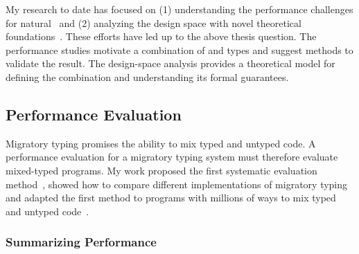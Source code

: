 %
%
%

My research to date has focused on
 (1) understanding the performance challenges for natural~\cite{tfgnvf-popl-2016,gtnffvf-jfp-2019}
 and (2) analyzing the design space with novel theoretical foundations~\cite{gf-icfp-2018}.
These efforts have led up to the above thesis question.
The performance studies motivate a combination of \tdeep{} and \tshallow{}
 types and suggest methods to validate the result.
The design-space analysis provides a theoretical model for defining the
 combination and understanding its formal guarantees.



\subsection{Performance Evaluation}

Migratory typing promises the ability to mix typed and untyped code.
A performance evaluation for a migratory typing system must therefore
 evaluate mixed-typed programs.
My work proposed the first systematic evaluation method~\cite{tfgnvf-popl-2016},
 showed how to compare different implementations of migratory typing~\cite{gtnffvf-jfp-2019}
 and adapted the first method to programs with millions
 of ways to mix typed and untyped code~\cite{gm-pepm-2018,gtnffvf-jfp-2019}.



\subsubsection{Summarizing Performance}



